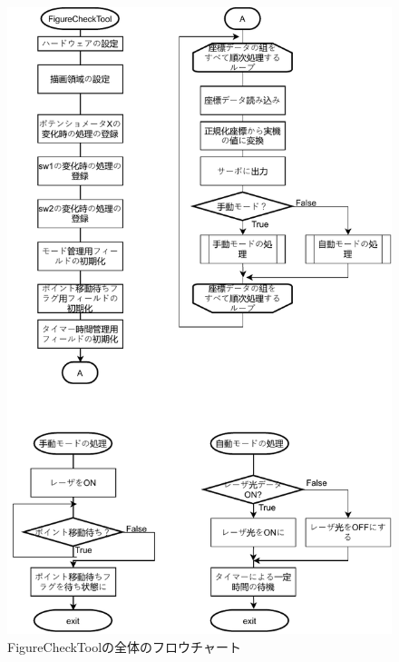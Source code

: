 \documentclass{jarticle}
\begin{document}
\begin{figure}[H]
    \centering
    \includegraphics{kumikomiKadai8-FigureCheckTolAll.pdf}
    \caption{FigureCheckToolの全体のフロウチャート}
    \label{fig:my_label}
\end{figure}
\end{document}
